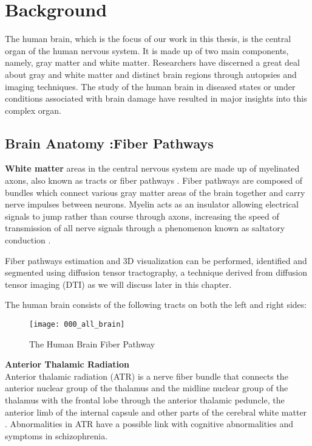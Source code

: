 \documentclass[../structure.tex]{subfiles}
\begin{document}
\chapter{Background}
The human brain, which is the focus of our work in this thesis, is the central organ of the human nervous system. It is made up of two main components, namely, gray matter and white matter. Researchers have discerned a great deal about gray and white matter and distinct brain regions through autopsies and imaging techniques. The study of the human brain in diseased states or under conditions associated with brain damage have resulted in major insights into this complex organ.

\section{Brain Anatomy :Fiber Pathways}
	 \textbf{White matter} areas in the central nervous system are made up of myelinated axons, also known as tracts or fiber pathways \cite{Blumenfeld2010}. Fiber pathways are composed of bundles which connect various gray matter areas of the brain together and carry nerve impulses between neurons. Myelin acts as an insulator allowing electrical signals to jump rather than course through axons, increasing the speed of transmission of all nerve signals through a phenomenon known as saltatory conduction \cite{Klein2008}.
	 
	  Fiber pathways estimation and 3D visualization can be performed, identified and segmented using diffusion tensor tractography, a technique derived from diffusion tensor imaging (DTI) \cite{Seo_2013} as we will discuss later in this chapter.
	
	The human brain consists of the following tracts on both the left and right sides:


	\begin{figure}[h!]
	\centering
	\texttt{[image: 000\_all\_brain]}
	\captionsetup{justification=centering}
	\caption{The Human Brain Fiber Pathway}
	\label{fig:all_brain}
	\end{figure}
	
	\textbf{Anterior Thalamic Radiation} \\
	Anterior thalamic radiation (ATR) is a nerve fiber bundle that connects the anterior nuclear group of the thalamus and the midline nuclear group of the thalamus with the frontal lobe through the anterior thalamic peduncle, the anterior limb of the internal capsule and other parts of the cerebral white matter \cite{Washington1994}\cite{Grimm2018}. Abnormalities in ATR have a possible link with cognitive abnormalities and symptoms in schizophrenia\cite{Mamah_2010}.	\\
		
\end{document}
